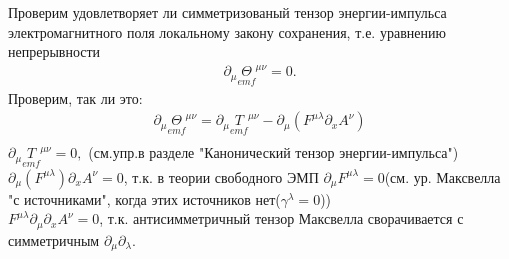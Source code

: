  
 Проверим удовлетворяет ли симметризованый тензор энергии-импульса электромагнитного поля локальному закону сохранения, т.е. уравнению непрерывности
 \begin{gather*}
 	\partial_\mu\underset{emf}{\Theta}^{\mu\nu} = 0.
 \end{gather*}
 Проверим, так ли это:
 \begin{gather*}
 	\partial_\mu\underset{emf}{\Theta}^{\mu\nu} = \partial_\mu\underset{emf}{T}^{\mu\nu} - \partial_\mu(F^{\mu\lambda}\partial_xA^\nu)\\
 \end{gather*}
 	$ 	\partial_\mu\underset{emf}{T}^{\mu\nu} = 0,$ (см.упр.в разделе "Канонический тензор энергии-импульса")\\
  	$\partial_\mu(F^{\mu\lambda})\partial_xA^\nu=0$, т.к. в теории свободного ЭМП $\partial_\mu F^{\mu\lambda}=0$(см. ур. Максвелла "с источниками", когда этих источников нет($\gamma^\lambda=0$))\\
  	$F^{\mu\lambda}\partial_\mu\partial_xA^\nu=0$, т.к. антисимметричный тензор Максвелла сворачивается с симметричным $\partial_\mu\partial_\lambda$.
